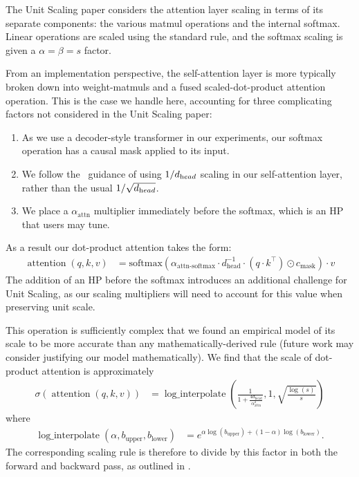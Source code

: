 The Unit Scaling paper considers the attention layer scaling in terms of its separate components: the various matmul operations and the internal softmax. Linear operations are scaled using the standard rule, and the softmax scaling is given a $\alpha = \beta = s$ factor.

From an implementation perspective, the self-attention layer is more typically broken down into weight-matmuls and a fused scaled-dot-product attention operation. This is the case we handle here, accounting for three complicating factors not considered in the Unit Scaling paper:
\begin{enumerate}
    \item As we use a decoder-style transformer in our experiments, our softmax operation has a causal mask applied to its input.
    \item We follow the \mup\ guidance of using $1/ d_{\text head}$ scaling in our self-attention layer, rather than the usual $1 / \sqrt{d_{\text head}}$.
    \item We place a $\alpha_{\mathrm{attn}}$ multiplier immediately before the softmax, which is an HP that users may tune.
\end{enumerate}
As a result our dot-product attention takes the form:
\begin{align*}
    \operatorname{attention}(q,k,v) &= \mathrm{softmax}\left(\alpha_{\mathrm{attn\text{-}softmax}} \cdot d_{\mathrm{head}}^{-1} \cdot (q \cdot k^\top) \odot c_\textrm{mask}\right) \cdot v
\end{align*}
The addition of an HP before the softmax introduces an additional challenge for Unit Scaling, as our scaling multipliers will need to account for this value when preserving unit scale.

This operation is sufficiently complex that we found an empirical model of its scale to be more accurate than any mathematically-derived rule (future work may consider justifying our model mathematically). We find that the scale of dot-product attention is approximately
\begin{align*}
    \sigma(\operatorname{attention}(q,k,v)) &= \operatorname{log\_interpolate}\left(\frac{1}{1 + \frac{4 d_{\mathrm{head}}}{\alpha_{\mathrm{attn}}^2}}, 1, \sqrt{\frac{\log(s)}{s}}\right)
\end{align*}
where
\begin{align*}
    \operatorname{log\_interpolate}(\alpha, b_\mathrm{upper}, b_\mathrm{lower}) &= e^{\alpha \log(b_\mathrm{upper}) + (1 - \alpha) \log(b_\mathrm{lower})}.
\end{align*}
The corresponding scaling rule is therefore to divide by this factor in both the forward and backward pass, as outlined in .

